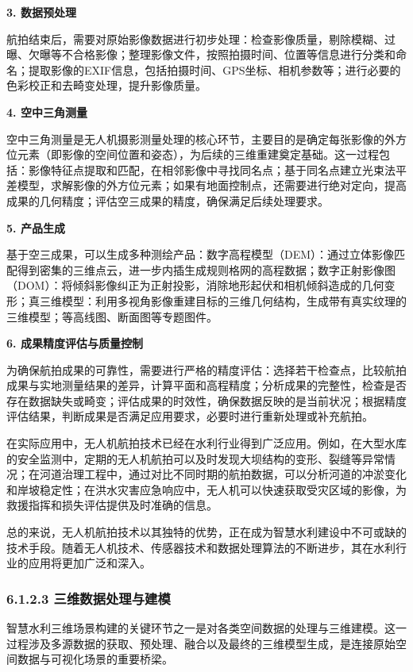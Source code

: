 \textbf{3. 数据预处理}

航拍结束后，需要对原始影像数据进行初步处理：检查影像质量，剔除模糊、过曝、欠曝等不合格影像；整理影像文件，按照拍摄时间、位置等信息进行分类和命名；提取影像的EXIF信息，包括拍摄时间、GPS坐标、相机参数等；进行必要的色彩校正和去畸变处理，提升影像质量。

\textbf{4. 空中三角测量}

空中三角测量是无人机摄影测量处理的核心环节，主要目的是确定每张影像的外方位元素（即影像的空间位置和姿态），为后续的三维重建奠定基础。这一过程包括：影像特征点提取和匹配，在相邻影像中寻找同名点；基于同名点建立光束法平差模型，求解影像的外方位元素；如果有地面控制点，还需要进行绝对定向，提高成果的几何精度；评估空三成果的精度，确保满足后续处理要求。

\textbf{5. 产品生成}

基于空三成果，可以生成多种测绘产品：数字高程模型（DEM）：通过立体影像匹配得到密集的三维点云，进一步内插生成规则格网的高程数据；数字正射影像图（DOM）：将倾斜影像纠正为正射投影，消除地形起伏和相机倾斜造成的几何变形；真三维模型：利用多视角影像重建目标的三维几何结构，生成带有真实纹理的三维模型；等高线图、断面图等专题图件。

\textbf{6. 成果精度评估与质量控制}

为确保航拍成果的可靠性，需要进行严格的精度评估：选择若干检查点，比较航拍成果与实地测量结果的差异，计算平面和高程精度；分析成果的完整性，检查是否存在数据缺失或畸变；评估成果的时效性，确保数据反映的是当前状况；根据精度评估结果，判断成果是否满足应用要求，必要时进行重新处理或补充航拍。

在实际应用中，无人机航拍技术已经在水利行业得到广泛应用。例如，在大型水库的安全监测中，定期的无人机航拍可以及时发现大坝结构的变形、裂缝等异常情况；在河道治理工程中，通过对比不同时期的航拍数据，可以分析河道的冲淤变化和岸坡稳定性；在洪水灾害应急响应中，无人机可以快速获取受灾区域的影像，为救援指挥和损失评估提供及时准确的信息。

总的来说，无人机航拍技术以其独特的优势，正在成为智慧水利建设中不可或缺的技术手段。随着无人机技术、传感器技术和数据处理算法的不断进步，其在水利行业的应用将更加广泛和深入。

\subsubsection{6.1.2.3
三维数据处理与建模}\label{ux4e09ux7ef4ux6570ux636eux5904ux7406ux4e0eux5efaux6a21}

智慧水利三维场景构建的关键环节之一是对各类空间数据的处理与三维建模。这一过程涉及多源数据的获取、预处理、融合以及最终的三维模型生成，是连接原始空间数据与可视化场景的重要桥梁。

